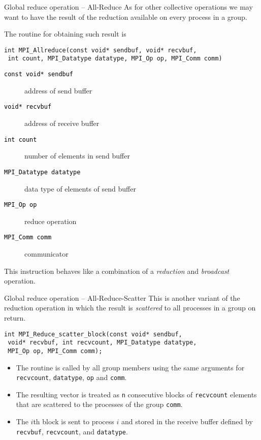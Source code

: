 \documentclass[xcolor={svgnames,usenames}]{beamer}
\begin{document}
\begin{frame}[fragile]{Global reduce operation -- All-Reduce}
\small
As for other collective operations we may want to have the result of the reduction available on every process in a group. 

The routine for obtaining such result is
\begin{verbatim}
int MPI_Allreduce(const void* sendbuf, void* recvbuf, 
 int count, MPI_Datatype datatype, MPI_Op op, MPI_Comm comm)
\end{verbatim}
\begin{description}
	\item[\textcolor{black}{\texttt{const void* sendbuf}}] address of send buffer
	\item[\textcolor{black}{\texttt{void* recvbuf}}] address of receive buffer
	\item[\textcolor{black}{\texttt{int count}}] number of elements in send buffer
	\item[\textcolor{black}{\texttt{MPI_Datatype datatype}}] data type of elements of send buffer
	\item[\textcolor{black}{\texttt{MPI_Op op}}] reduce operation
	\item[\textcolor{black}{\texttt{MPI_Comm comm}}] communicator
\end{description}
This instruction behaves like a combination of a \emph{reduction} and \emph{broadcast} operation.
\end{frame}

\begin{frame}[fragile]{Global reduce operation -- All-Reduce-Scatter}
This is another variant of the reduction operation in which the result is \emph{scattered} to all processes in a group on return.
\begin{verbatim}
int MPI_Reduce_scatter_block(const void* sendbuf, 
 void* recvbuf, int recvcount, MPI_Datatype datatype, 
 MPI_Op op, MPI_Comm comm);
\end{verbatim}
\begin{itemize}
\item The routine is called by all group members using the same arguments for \texttt{recvcount}, \texttt{datatype}, \texttt{op} and \texttt{comm}. 
\item The resulting vector is treated as \texttt{n} consecutive blocks of \texttt{recvcount} elements that are scattered to the processes of the group \texttt{comm}.
\item The $i$th block is sent to process $i$ and stored in the receive buffer defined by \texttt{recvbuf}, \texttt{recvcount}, and \texttt{datatype}.
\end{itemize}
\end{frame}
\end{document}

